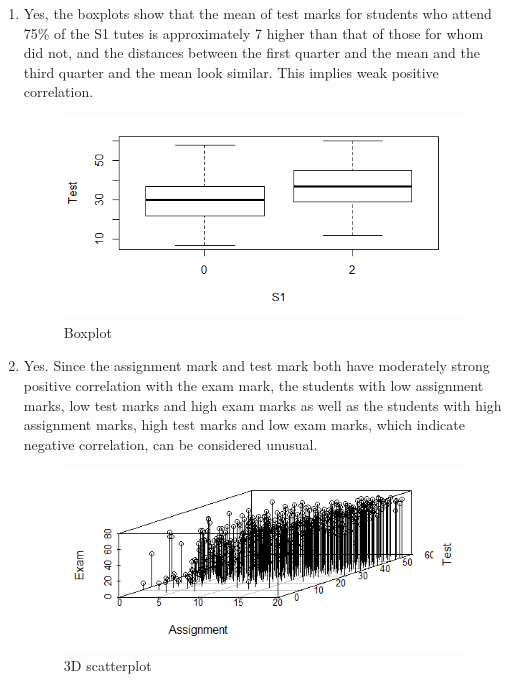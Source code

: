 \documentclass[10pt]{article}
\begin{document}
\begin{enumerate}[1)]
\item
Yes, the boxplots show that the mean of test marks for students who attend 75\% of the S1 tutes is approximately 7 higher than that of those for whom did not, and the distances between the first quarter and the mean and the third quarter and the mean look similar. This implies weak positive correlation.
\begin{figure}[H]
  \centering
  \includegraphics[scale=0.45]{p12a.png}
  \caption{Boxplot}
\end{figure}

\item
Yes. Since the assignment mark and test mark both have moderately strong positive correlation with the exam mark, the students with low assignment marks, low test marks and high exam marks as well as the students with high assignment marks, high test marks and low exam marks, which indicate negative correlation, can be considered unusual.
\begin{figure}[H]
  \centering
  \includegraphics[scale=0.45]{p13a.png}
  \caption{3D scatterplot}
\end{figure}


\end{enumerate}
\end{document}
